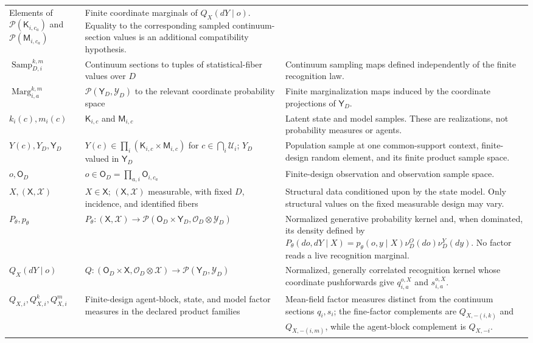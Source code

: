 \begin{longtable}{>{\raggedright\arraybackslash}p{}>{\raggedright\arraybackslash}p{}>{\raggedright\arraybackslash}p{}}
Elements of \(\mathcal P(\mathsf K_{i,c_a})\) and \(\mathcal P(\mathsf M_{i,c_a})\) &
Finite coordinate marginals of \(Q_X(dY\mid o)\). Equality to the corresponding sampled continuum-section values is an additional compatibility hypothesis.\\
\(\operatorname{Samp}_{D,i}^{k,m}\) &
Continuum sections to tuples of statistical-fiber values over \(D\) &
Continuum sampling maps defined independently of the finite recognition law.\\
\(\operatorname{Marg}_{i,a}^{k,m}\) &
\(\mathcal P(\mathsf Y_D,\mathscr Y_D)\) to the relevant coordinate probability space &
Finite marginalization maps induced by the coordinate projections of \(\mathsf Y_D\).\\
\(k_i(c),m_i(c)\) &
\(\mathsf K_{i,c}\) and \(\mathsf M_{i,c}\) &
Latent state and model samples. These are realizations, not probability measures or agents.\\
\(Y(c),Y_D,\mathsf Y_D\) &
\(Y(c)\in\prod_i(\mathsf K_{i,c}\times\mathsf M_{i,c})\) for \(c\in\bigcap_i\mathcal U_i\); \(Y_D\) valued in \(\mathsf Y_D\) &
Population sample at one common-support context, finite-design random element, and its finite product sample space.\\
\(o,\mathsf O_D\) &
\(o\in\mathsf O_D=\prod_{a,i}\mathsf O_{i,c_a}\) &
Finite-design observation and observation sample space.\\
\(X,(\mathsf X,\mathscr X)\) &
\(X\in\mathsf X\); \((\mathsf X,\mathscr X)\) measurable, with fixed \(D\), incidence, and identified fibers &
Structural data conditioned upon by the state model. Only structural values on the fixed measurable design may vary.\\
\(P_\theta,p_\theta\) &
\(P_\theta:(\mathsf X,\mathscr X)\to\mathcal P(\mathsf O_D\times\mathsf Y_D,\mathscr O_D\otimes\mathscr Y_D)\) &
Normalized generative probability kernel and, when dominated, its density defined by \(P_\theta(do,dY\mid X)=p_\theta(o,y\mid X)\nu_D^O(do)\nu_D^Y(dy)\). No factor reads a live recognition marginal.\\
\(Q_X(dY\mid o)\) &
\(Q:(\mathsf O_D\times\mathsf X,\mathscr O_D\otimes\mathscr X)\to\mathcal P(\mathsf Y_D,\mathscr Y_D)\) &
Normalized, generally correlated recognition kernel whose coordinate pushforwards give \(q_{i,a}^{o,X}\) and \(s_{i,a}^{o,X}\).\\
\(Q_{X,i},Q^k_{X,i},Q^m_{X,i}\) &
Finite-design agent-block, state, and model factor measures in the declared product families &
Mean-field factor measures distinct from the continuum sections \(q_i,s_i\); the fine-factor complements are \(Q_{X,-(i,k)}\) and \(Q_{X,-(i,m)}\), while the agent-block complement is \(Q_{X,-i}\).\\

\end{longtable}
